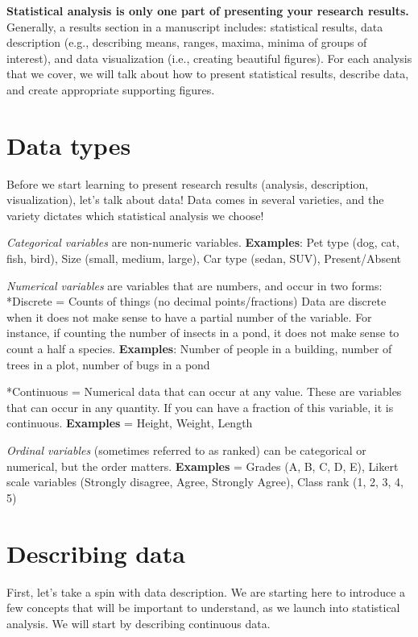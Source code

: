 \documentclass[
]{book}
\begin{document}
\textbf{Statistical analysis is only one part of presenting your research results.} Generally, a results section in a manuscript includes: statistical results, data description (e.g., describing means, ranges, maxima, minima of groups of interest), and data visualization (i.e., creating beautiful figures). For each analysis that we cover, we will talk about how to present statistical results, describe data, and create appropriate supporting figures.

\hypertarget{data-types}{%
\section{Data types}\label{data-types}}

Before we start learning to present research results (analysis, description, visualization), let's talk about data! Data comes in several varieties, and the variety dictates which statistical analysis we choose!

\emph{Categorical variables} are non-numeric variables.
\textbf{Examples}: Pet type (dog, cat, fish, bird), Size (small, medium, large), Car type (sedan, SUV), Present/Absent

\emph{Numerical variables} are variables that are numbers, and occur in two forms:
*Discrete = Counts of things (no decimal points/fractions)
Data are discrete when it does not make sense to have a partial number of the variable. For instance, if counting the number of insects in a pond, it does not make sense to count a half a species.
\textbf{Examples}: Number of people in a building, number of trees in a plot, number of bugs in a pond

*Continuous = Numerical data that can occur at any value.
These are variables that can occur in any quantity. If you can have a fraction of this variable, it is continuous.
\textbf{Examples} = Height, Weight, Length

\emph{Ordinal variables} (sometimes referred to as ranked) can be categorical or numerical, but the order matters.
\textbf{Examples} = Grades (A, B, C, D, E), Likert scale variables (Strongly disagree, Agree, Strongly Agree), Class rank (1, 2, 3, 4, 5)

\hypertarget{describing-data}{%
\section{Describing data}\label{describing-data}}

First, let's take a spin with data description. We are starting here to introduce a few concepts that will be important to understand, as we launch into statistical analysis. We will start by describing continuous data.
\end{document}
